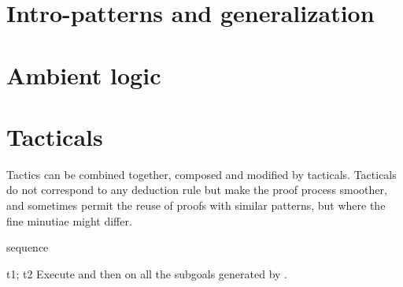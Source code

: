 \section{Intro-patterns and generalization}

\label{s:intro-pattern}
\label{s:gen-pattern}

\section{Ambient logic}



































\section{Tacticals}

Tactics can be combined together, composed and modified by tacticals. Tacticals do not
correspond to any deduction rule but make the proof process smoother, and sometimes permit
the reuse of proofs with similar patterns, but where the fine minutiae might differ.

\begin{tactic}[t1; t2]{sequence}
  \begin{tsyntax}[empty]{t1; t2}
  Execute  and then  on all the subgoals generated by .
  \end{tsyntax}
\end{tactic}

